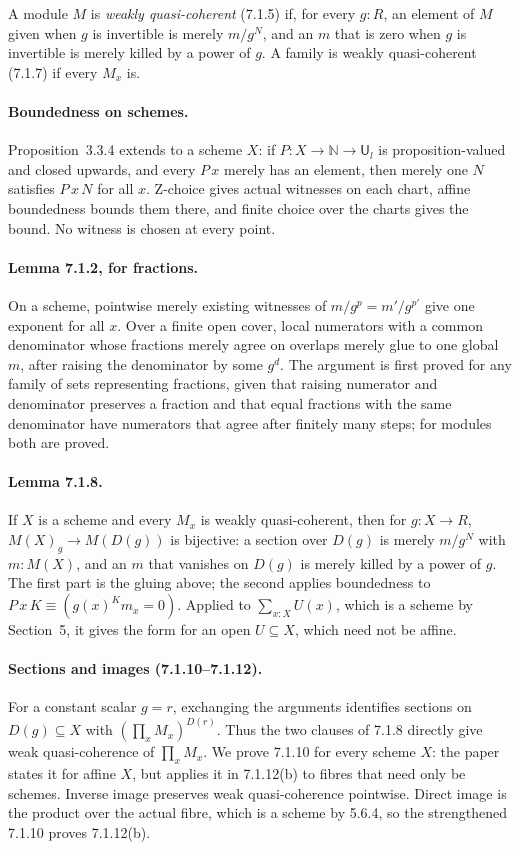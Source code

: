 \documentclass[11pt]{article}
\newcommand{\U}{\mathsf{U}}
\theoremstyle{remark}
\begin{document}
A module $M$ is \emph{weakly quasi-coherent} (7.1.5) if, for every
$g:R$, an element of $M$ given when $g$ is invertible is merely $m/g^N$,
and an $m$ that is zero when $g$ is invertible is merely killed by a
power of $g$. A family is weakly quasi-coherent (7.1.7) if every $M_x$ is.

\paragraph{Boundedness on schemes.} Proposition~3.3.4 extends to a
scheme $X$: if $P:X\to\mathbb N\to\U_l$ is proposition-valued and closed
upwards, and every $P\,x$ merely has an element, then merely one $N$
satisfies $P\,x\,N$ for all $x$. Z-choice gives actual witnesses on each
chart, affine boundedness bounds them there, and finite choice over
the charts gives the bound. No witness is chosen at every point.

\paragraph{Lemma 7.1.2, for fractions.} On a scheme, pointwise merely
existing witnesses of $m/g^p=m'/g^{p'}$ give one exponent for all $x$.
Over a finite open cover, local numerators with a common denominator
whose fractions merely agree on overlaps merely glue to one global $m$,
after raising the denominator by some $g^d$. The argument is first
proved for any family of sets representing fractions, given that raising
numerator and denominator preserves a fraction and that equal fractions
with the same denominator have numerators that agree after finitely many
steps; for modules both are proved.

\paragraph{Lemma 7.1.8.} If $X$ is a scheme and every $M_x$ is weakly
quasi-coherent, then for $g:X\to R$, $M(X)_g\to M(D(g))$ is bijective:
a section over $D(g)$ is merely $m/g^N$ with $m:M(X)$, and an $m$ that
vanishes on $D(g)$ is merely killed by a power of $g$. The first part
is the gluing above; the second applies boundedness to
$P\,x\,K\equiv(g(x)^Km_x=0)$. Applied to $\sum_{x:X}U(x)$, which is a
scheme by Section~5, it gives the form for an open $U\subseteq X$, which
need not be affine.

\paragraph{Sections and images (7.1.10--7.1.12).}
For a constant scalar $g=r$, exchanging the arguments identifies sections
on $D(g)\subseteq X$ with $(\prod_x M_x)^{D(r)}$. Thus the two clauses
of 7.1.8 directly give weak quasi-coherence of $\prod_x M_x$.
We prove 7.1.10 for every scheme $X$: the paper states it for affine $X$,
but applies it in 7.1.12(b) to fibres that need only be schemes.
Inverse image preserves weak quasi-coherence pointwise. Direct image
is the product over the actual fibre, which is a scheme by 5.6.4,
so the strengthened 7.1.10 proves 7.1.12(b).
\end{document}
